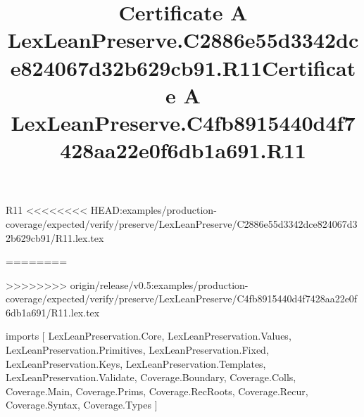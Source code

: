 \begin{lexlean}{R11}
<<<<<<<< HEAD:examples/production-coverage/expected/verify/preserve/LexLeanPreserve/C2886e55d3342dce824067d32b629cb91/R11.lex.tex
\title{Certificate A LexLeanPreserve.C2886e55d3342dce824067d32b629cb91.R11}
========
\title{Certificate A LexLeanPreserve.C4fb8915440d4f7428aa22e0f6db1a691.R11}
>>>>>>>> origin/release/v0.5:examples/production-coverage/expected/verify/preserve/LexLeanPreserve/C4fb8915440d4f7428aa22e0f6db1a691/R11.lex.tex
\begin{coremodule}
imports [
  LexLeanPreservation.Core,
  LexLeanPreservation.Values,
  LexLeanPreservation.Primitives,
  LexLeanPreservation.Fixed,
  LexLeanPreservation.Keys,
  LexLeanPreservation.Templates,
  LexLeanPreservation.Validate,
  Coverage.Boundary,
  Coverage.Colls,
  Coverage.Main,
  Coverage.Prims,
  Coverage.RecRoots,
  Coverage.Recur,
  Coverage.Syntax,
  Coverage.Types
]


\end{coremodule}
\end{lexlean}
